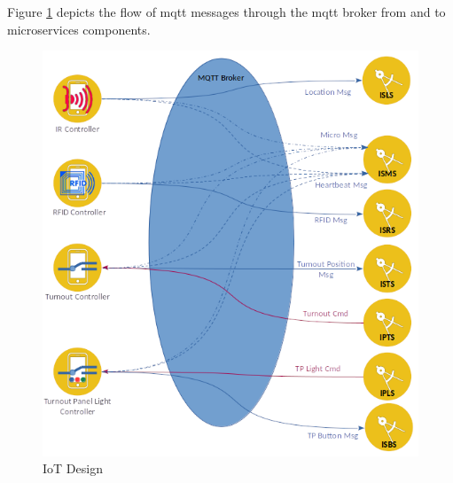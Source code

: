 Figure \ref{fig:iotdesign} depicts the flow of \gls{mqtt} messages through the \gls{mqtt} broker from and to microservices components.

\begin{figure}[H]
	\centering
		\includegraphics[scale=0.7]{mqtt.png}
	\caption{IoT Design}
	\label{fig:iotdesign}
\end{figure}

